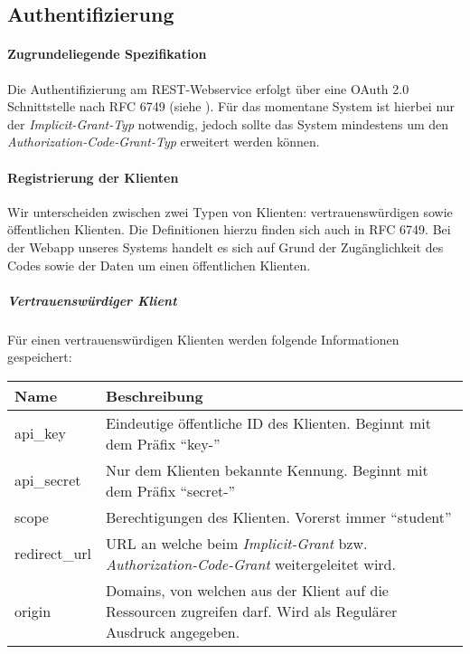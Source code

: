 \subsection{Authentifizierung}
\label{subsec:api-auth}
\paragraph{Zugrundeliegende Spezifikation} Die Authentifizierung am REST-Webservice erfolgt über eine OAuth 2.0 Schnittstelle nach RFC 6749 (siehe \cite{rfc6749}).
Für das momentane System ist hierbei nur der \textit{Implicit-Grant-Typ} notwendig, jedoch sollte das System mindestens um den \textit{Authorization-Code-Grant-Typ} erweitert werden können.
\paragraph{Registrierung der Klienten}
Wir unterscheiden zwischen zwei Typen von Klienten: vertrauenswürdigen sowie öffentlichen Klienten. Die Definitionen hierzu finden sich auch in RFC 6749. Bei der Webapp unseres Systems handelt es sich auf Grund der Zugänglichkeit des Codes sowie der Daten um einen öffentlichen Klienten.
\subparagraph{Vertrauenswürdiger Klient}
Für einen vertrauenswürdigen Klienten werden folgende Informationen gespeichert:\\
\begin{tabularx}{\textwidth}{@{} | X | X | @{}}
	\hline
	\textbf{Name} & \textbf{Beschreibung}\\ \hline \hline
	api\_key & Eindeutige öffentliche ID des Klienten. Beginnt mit dem Präfix \enquote{key-} \\ \hline
	api\_secret & Nur dem Klienten bekannte Kennung. Beginnt mit dem Präfix \enquote{secret-} \\ \hline
	scope & Berechtigungen des Klienten. Vorerst immer \enquote{student} \\ \hline
	redirect\_url & URL an welche beim \textit{Implicit-Grant} bzw. \textit{Authorization-Code-Grant} weitergeleitet wird. \\ \hline
	origin & Domains, von welchen aus der Klient auf die Ressourcen zugreifen darf. Wird als Regulärer Ausdruck angegeben. \\
	\hline
\end{tabularx}

